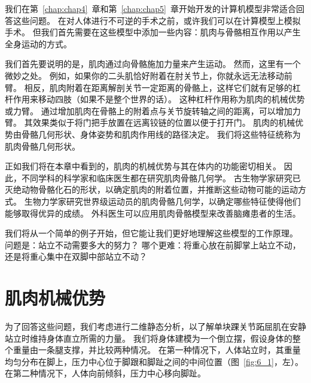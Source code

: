 我们在第~\ref{chap:chap4}~章和第~\ref{chap:chap5}~章开始开发的计算机模型非常适合回答这些问题。
在对人体进行不可逆的手术之前，或许我们可以在计算模型上模拟手术。
但我们首先需要在这些模型中添加一些内容：肌肉与骨骼相互作用以产生全身运动的方式。


我们首先要说明的是，肌肉通过向骨骼施加力量来产生运动。
然而，这里有一个微妙之处。
例如，如果你的二头肌恰好附着在肘关节上，你就永远无法移动前臂。
相反，肌肉附着在距离解剖关节一定距离的骨骼上，这样它们就有足够的杠杆作用来移动四肢（如果不是整个世界的话）。
这种杠杆作用称为肌肉的机械优势或力臂。
通过增加肌肉在骨骼上的附着点与关节旋转轴之间的距离，可以增加力臂。
其效果类似于将门把手放置在远离铰链的位置以便于打开门。
肌肉的机械优势由骨骼几何形状、身体姿势和肌肉作用线的路径决定。
我们将这些特征统称为肌肉骨骼几何形状。


正如我们将在本章中看到的，肌肉的机械优势与其在体内的功能密切相关。
因此，不同学科的科学家和临床医生都在研究肌肉骨骼几何学。
古生物学家研究已灭绝动物骨骼化石的形状，以确定肌肉的附着位置，并推断这些动物可能的运动方式。
生物力学家研究世界级运动员的肌肉骨骼几何学，以确定哪些特征使得他们能够取得优异的成绩。
外科医生可以应用肌肉骨骼模型来改善脑瘫患者的生活。


我们将从一个简单的例子开始，但它能让我们更好地理解这些模型的工作原理。
问题是：站立不动需要多大的努力？
哪个更难：将重心放在前脚掌上站立不动，还是将重心集中在双脚中部站立不动？


\section{肌肉机械优势}

为了回答这些问题，我们考虑进行二维静态分析，以了解单块踝关节跖屈肌在安静站立时维持身体直立所需的力量。
我们将身体建模为一个倒立摆，假设身体的整个重量由一条腿支撑，并比较两种情况。
在第一种情况下，人体站立时，其重量均匀分布在脚上，压力中心位于脚跟和脚趾之间的中间位置（图~\ref{fig:6_1}，左）。
在第二种情况下，人体向前倾斜，压力中心移向脚趾。


